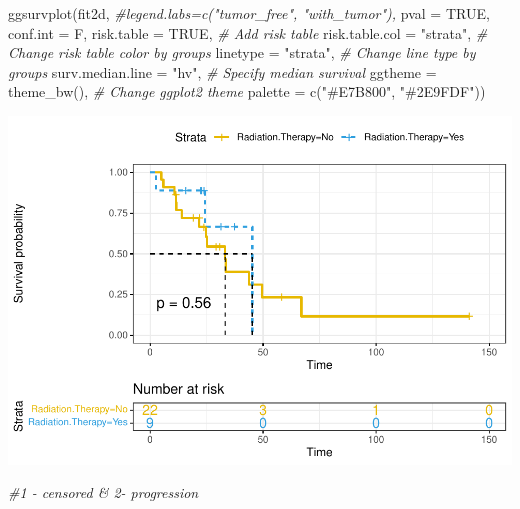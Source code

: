 \documentclass[
  11pt,
]{article}
\newenvironment{Shaded}{\begin{snugshade}}{\end{snugshade}}
\newcommand{\AttributeTok}[1]{\textcolor[rgb]{0.77,0.63,0.00}{#1}}
\newcommand{\CommentTok}[1]{\textcolor[rgb]{0.56,0.35,0.01}{\textit{#1}}}
\newcommand{\ConstantTok}[1]{\textcolor[rgb]{0.00,0.00,0.00}{#1}}
\newcommand{\FunctionTok}[1]{\textcolor[rgb]{0.00,0.00,0.00}{#1}}
\newcommand{\NormalTok}[1]{#1}
\newcommand{\StringTok}[1]{\textcolor[rgb]{0.31,0.60,0.02}{#1}}
\begin{document}
\begin{Shaded}
\begin{Highlighting}[]
\FunctionTok{ggsurvplot}\NormalTok{(fit2d,}
          \CommentTok{\#legend.labs=c("tumor\_free", "with\_tumor"),}
          \AttributeTok{pval =} \ConstantTok{TRUE}\NormalTok{, }\AttributeTok{conf.int =}\NormalTok{ F,}
          \AttributeTok{risk.table =} \ConstantTok{TRUE}\NormalTok{, }\CommentTok{\# Add risk table}
          \AttributeTok{risk.table.col =} \StringTok{"strata"}\NormalTok{, }\CommentTok{\# Change risk table color by groups}
          \AttributeTok{linetype =} \StringTok{"strata"}\NormalTok{, }\CommentTok{\# Change line type by groups}
          \AttributeTok{surv.median.line =} \StringTok{"hv"}\NormalTok{, }\CommentTok{\# Specify median survival}
          \AttributeTok{ggtheme =} \FunctionTok{theme\_bw}\NormalTok{(), }\CommentTok{\# Change ggplot2 theme}
          \AttributeTok{palette =} \FunctionTok{c}\NormalTok{(}\StringTok{"\#E7B800"}\NormalTok{, }\StringTok{"\#2E9FDF"}\NormalTok{))}
\end{Highlighting}
\end{Shaded}

\includegraphics{Random_new_surv_4_files/figure-latex/unnamed-chunk-13-1.pdf}

\begin{Shaded}
\begin{Highlighting}[]
\CommentTok{\#1 {-} censored \& 2{-} progression}
\end{Highlighting}
\end{Shaded}
\end{document}
